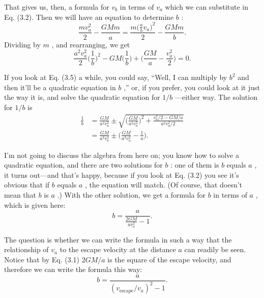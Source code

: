 \documentclass[11pt,oneside]{article}
\begin{document}
That gives us, then, a formula for \(v_b\) in terms of \(v_a\) which we can substitute in Eq. (3.2). Then we will have an equation to determine \(b\) : 
\begin{equation*} \tag{3.4}
\label{Eq:TIPS:3:4} \frac{mv_a^2}{2} - \frac{GMm}{a} = \frac{m\bigg({\displaystyle \frac{a}{b}v_a}\bigg)^2}{2} - \frac{GMm}{b}. \end{equation*}
 Dividing by \(m\) , and rearranging, we get 
\begin{equation*} \tag{3.5}
\label{Eq:TIPS:3:5} \frac{a^2v_a^2}{2}\bigg(\frac{1}{b}\bigg)^2\!\!\!- GM\bigg(\frac{1}{b}\bigg)\!+\!\bigg(\frac{GM}{a} - \frac{v_a^2}{2}\bigg)\!=0. \end{equation*}
\par

If you look at Eq. (3.5) a while, you could say, ``Well, I can multiply by \(b^2\) and then it'll be a quadratic equation in \(b\) ,'' or, if you prefer, you could look at it just the way it is, and solve the quadratic equation for \(1/b\) ---either way. The solution for \(1/b\) is 
\begin{equation*} \begin{aligned} \frac{1}{b} &= \frac{GM}{a^2v_a^2} \pm \sqrt{\bigg(\frac{GM}{a^2v_a^2}\bigg)^2 + \frac{v_a^2/2-GM/a}{a^2v_a^2/2}}\\[1ex] &= \frac{GM}{a^2v_a^2} \pm \bigg(\frac{GM}{a^2v_a^2} - \frac{1}{a}\bigg). \end{aligned} \tag{3.6}
\label{Eq:TIPS:3:6} \end{equation*}
\par

I'm not going to discuss the algebra from here on; you know how to solve a quadratic equation, and there are two solutions for \(b\) : one of them is \(b\) equals \(a\) , it turns out---and that's happy, because if you look at Eq. (3.2) you see it's obvious that if \(b\) equals \(a\) , the equation will match. (Of course, that doesn't mean that \(b\) is \(a\) .) With the other solution, we get a formula for \(b\) in terms of \(a\) , which is given here: 
\begin{equation*} \tag{3.7}
\label{Eq:TIPS:3:7} b = \frac{a}{\displaystyle \frac{2GM}{av_a^2}-1}. \end{equation*}
\par

The question is whether we can write the formula in such a way that the relationship of \(v_a\) to the escape velocity at the distance \(a\) can readily be seen. Notice that by Eq. (3.1) \(2GM/a\) is the square of the escape velocity, and therefore we can write the formula this way: 
\begin{equation*} \tag{3.8}
\label{Eq:TIPS:3:8} b = \frac{a}{(v_\text{escape}/v_a)^2-1}. \end{equation*}
\par
\end{document}

